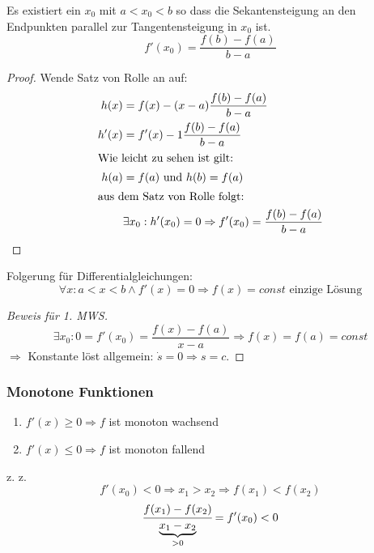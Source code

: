 Es existiert ein $x_0$ mit $a < x_0 < b$ so dass die Sekantensteigung an den Endpunkten parallel zur Tangentensteigung in $x_0$ ist.
\begin{equation*}
	f'(x_0) = \frac{f(b) - f(a)}{b - a}
\end{equation*}
\begin{proof}
	Wende Satz von Rolle an auf:
	\begin{align*}
		h(x) &= f(x) - (x - a)\frac{f(b) - f(a)}{b - a} \\
		h'(x) &= f'(x) - 1\frac{f(b) - f(a)}{b - a} \\
		\intertext{Wie leicht zu sehen ist gilt:}
		h(a) &= f(a)\text{ und }h(b) = f(a) \\
		\intertext{aus dem Satz von Rolle folgt:}
		&\exists x_0 : h'(x_0) = 0 \Rightarrow f'(x_0) = \frac{f(b) - f(a)}{b - a}
	\end{align*}
\end{proof}
Folgerung für Differentialgleichungen:
\begin{equation*}
	\forall x : a < x < b \wedge f'(x) = 0 \Rightarrow f(x) = const \text{ einzige Lösung}
\end{equation*}
\begin{proof}[Beweis für 1. MWS]
	\begin{equation*}
		\exists x_0 : 0 = f'(x_0) = \frac{f(x) - f(a)}{x - a} \Rightarrow f(x) = f(a) = const
	\end{equation*}
	$\Rightarrow$ Konstante löst allgemein: $\dot s = 0 \Rightarrow s = c$.
\end{proof}

\subsubsection*{Monotone Funktionen}
\begin{enumerate}
	\item $f'(x) \geq 0 \Rightarrow f$ ist monoton wachsend
	\item $f'(x) \leq 0 \Rightarrow f$ ist monoton fallend
\end{enumerate}
\begin{example}
	z. z. \[f'(x_0) < 0 \Rightarrow x_1 > x_2 \Rightarrow f(x_1) < f(x_2)\]
	\[\cfrac{f(x_1) - f(x_2)}{\underbrace{x_1 - x_2}_{> 0}} = f'(x_0) < 0\]
\end{example}


